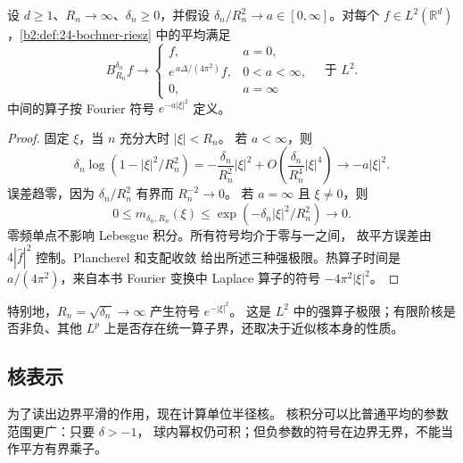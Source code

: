 \begin{proposition}[阶数与半径的联合平方极限]\label{b2:prop:24-heat-limit}
设 \(d\geq1\)、\(R_n\to\infty\)、\(\delta_n\geq0\)，并假设
\(\delta_n/R_n^2\to a\in[0,\infty]\)。对每个
\(f\in L^2(\mathbb R^d)\)，\cref{b2:def:24-bochner-riesz}
中的平均满足
\[
 B_{R_n}^{\delta_n}f\longrightarrow
 \begin{cases}
 f,&a=0,\\
 e^{\,a\Delta/(4\pi^2)}f,&0<a<\infty,\\
 0,&a=\infty
 \end{cases}
 \quad\text{于 }L^2.
\]
中间的算子按 Fourier 符号 \(e^{-a|\xi|^2}\) 定义。
\end{proposition}
\begin{proof}
固定 \(\xi\)，当 \(n\) 充分大时 \(|\xi|<R_n\)。
若 \(a<\infty\)，则
\[
 \delta_n\log(1-|\xi|^2/R_n^2)
 =-\frac{\delta_n}{R_n^2}|\xi|^2
       +O\!\left(\frac{\delta_n}{R_n^4}|\xi|^4\right)
       \longrightarrow-a|\xi|^2.
\]
误差趋零，因为 \(\delta_n/R_n^2\) 有界而 \(R_n^{-2}\to0\)。
若 \(a=\infty\) 且 \(\xi\neq0\)，则
\[
 0\leq m_{\delta_n,R_n}(\xi)
       \leq\exp(-\delta_n|\xi|^2/R_n^2)\longrightarrow0.
\]
零频单点不影响 Lebesgue 积分。所有符号均介于零与一之间，
故平方误差由 \(4|\widehat f|^2\) 控制。Plancherel 和支配收敛
给出所述三种强极限。热算子时间是 \(a/(4\pi^2)\)，来自本书
Fourier 变换中 Laplace 算子的符号 \(-4\pi^2|\xi|^2\)。
\end{proof}

特别地，\(R_n=\sqrt{\delta_n}\to\infty\) 产生符号 \(e^{-|\xi|^2}\)。
这是 \(L^2\) 中的强算子极限；有限阶核是否非负、其他
\(L^p\) 上是否存在统一算子界，还取决于近似核本身的性质。

\subsection{核表示}
\label{b2:subsec:240103}

为了读出边界平滑的作用，现在计算单位半径核。
核积分可以比普通平均的参数范围更广：只要 \(\delta>-1\)，
球内幂权仍可积；但负参数的符号在边界无界，不能当作平方有界乘子。

